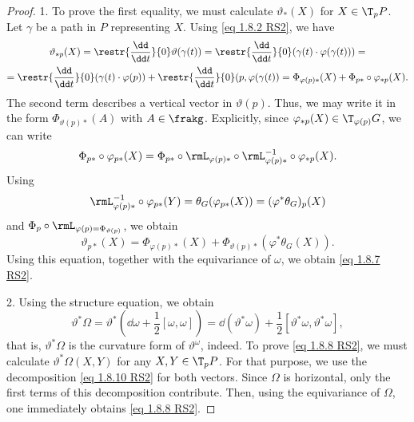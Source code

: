 \begin{proof}
    1. To prove the first equality, we must calculate $\vartheta_\ast(X)$ for $X\in \T_pP$. Let $\gamma$ be a path in $P$ representing $X$.  Using \eqref{eq 1.8.2 RS2}, we have
    \begin{multline}
        \vartheta_{\ast p}(X)=\restr{\frac{\dd}{\dd t}}{0}\vartheta(\gamma(t))=\restr{\frac{\dd}{\dd t}}{0} (\gamma(t)\cdot \varphi(\gamma(t)))=
        \\=\restr{\frac{\dd}{\dd t}}{0}(\gamma(t)\cdot \varphi(p))+\restr{\frac{\dd}{\dd t}}{0}(p,\varphi(\gamma(t))=\Phi_{\varphi(p)\ast}(X)+\Phi_{p\ast}\circ \varphi_{\ast p}(X).
    \end{multline}
    The second term describes a vertical vector in $\vartheta(p)$. Thus, we may write it in the form $\Phi_{\vartheta(p)\ast}(A)$ with $A\in\frakg$. Explicitly, since $\varphi_{\ast p}(X)\in \T_{\varphi(p)}G$, we can write
    \[\Phi_{p\ast}\circ \varphi_{p\ast }(X)=\Phi_{p\ast}\circ \rmL_{\varphi(p)\ast}\circ \rmL_{\varphi(p)\ast}^{-1}\circ \varphi_{\ast p}(X).\]
    Using
    \[\rmL_{\varphi(p)\ast}^{-1}\circ \varphi_{p\ast}(Y)=\theta_G(\varphi_{p\ast}(X))=(\varphi^\ast\theta_G)_p(X)\]
    and $\Phi_p\circ \rmL_{\varphi(p)=\Phi_{\vartheta(p)}}$, we obtain
    \[\vartheta_{p\ast}(X)=\Phi_{\varphi(p)\ast}(X)+\Phi_{\vartheta(p)\ast}(\varphi^\ast\theta_G(X)).\label{eq 1.8.10 RS2}\]
    Using this equation, together with the equivariance of $\omega$, we obtain \eqref{eq 1.8.7 RS2}.

    2. Using the structure equation, we obtain
    \[\vartheta^\ast\Omega=\vartheta^\ast\left(\dd \omega+\frac12[\omega,\omega]\right)=\dd(\vartheta^\ast\omega)+\frac12[\vartheta^\ast\omega,\vartheta^\ast\omega],\]
    that is, $\vartheta^\ast\Omega$ is the curvature form of $\vartheta^\omega$, indeed. To prove \eqref{eq 1.8.8 RS2}, we must calculate $\vartheta^\ast \Omega(X,Y)$ for any $X,Y\in \T_pP$. For that purpose, we use the decomposition \eqref{eq 1.8.10 RS2} for both vectors. Since $\Omega$ is horizontal, only the first terms of this decomposition contribute. Then, using the equivariance of $\Omega$, one immediately obtains \eqref{eq 1.8.8 RS2}.
\end{proof}

